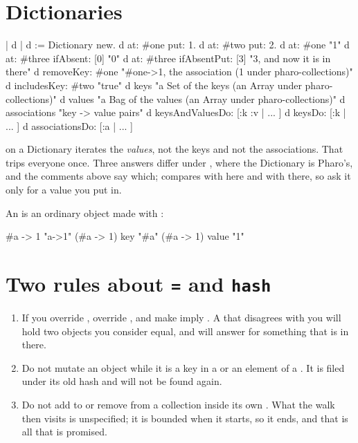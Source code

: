 \section{Dictionaries}

\begin{st}
| d |
d := Dictionary new.
d at: #one put: 1.
d at: #two put: 2.
d at: #one                       "1"
d at: #three ifAbsent: [0]       "0"
d at: #three ifAbsentPut: [3]    "3, and now it is in there"
d removeKey: #one                "#one->1, the association (1 under pharo-collections)"
d includesKey: #two              "true"
d keys                           "a Set of the keys (an Array under pharo-collections)"
d values                         "a Bag of the values (an Array under pharo-collections)"
d associations                   "key -> value pairs"
d keysAndValuesDo: [:k :v | ... ]
d keysDo: [:k | ... ]
d associationsDo: [:a | ... ]
\end{st}

 on a Dictionary iterates the \emph{values}, not the keys and not the
associations. That trips everyone once. Three answers differ under
, where the Dictionary is Pharo's, and the
comments above say which;  compares with \ct{==} here and
with \ct{=} there, so ask it only for a value you put in.

An  is an ordinary object made with \ct{->}:

\begin{st}
#a -> 1                      "a->1"
(#a -> 1) key                "#a"
(#a -> 1) value              "1"
\end{st}

\section{Two rules about \texttt{=} and \texttt{hash}}

\begin{enumerate}
\item If you override \ct{=}, override , and make  imply
  . A  that disagrees with you will hold two
  objects you consider equal, and  will answer  for
  something that is in there.
\item Do not mutate an object while it is a key in a  or an
  element of a . It is filed under its old hash and will not be found
  again.
\item Do not add to or remove from a collection inside its own .
  What the walk then visits is unspecified; it is bounded when it starts, so
  it ends, and that is all that is promised.
\end{enumerate}

